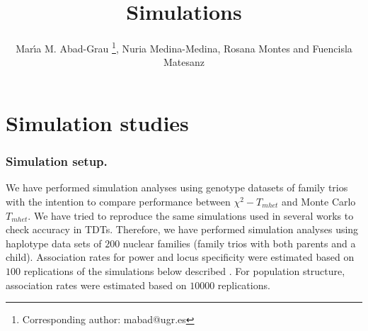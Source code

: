 \documentclass[runningheads]{llncs}
\begin{document}
\mainmatter 


\title{Simulations}





\author{Mar\'{\i}a M. Abad-Grau
\thanks{Corresponding author: mabad@ugr.es}, Nuria Medina-Medina, Rosana Montes and Fuencisla Matesanz }
%





\date{}

\maketitle




\section{Simulation studies}\label{sec:simulations}

\subsubsection{Simulation setup.}

We have performed simulation analyses using genotype datasets of family trios with the intention to compare performance between $\chi^2-T_{mhet}$ and Monte Carlo $T_{mhet}$.
We have tried to reproduce the same simulations used in several works to check accuracy in TDTs\cite{Sham.97,Zhang.zz.2003,Yu.zz.2005}. Therefore, we have performed simulation analyses using haplotype data sets of $200$ nuclear families (family trios with both parents and a child).
Association rates for power and locus specificity were estimated based on $100$ replications 
of the simulations below described \cite{Sham.97,Zhang.zz.2003,Yu.zz.2005}.
For population structure, association rates were estimated based on $10000$ replications.
\end{document}
